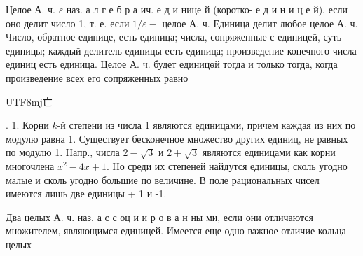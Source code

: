 \documentclass[10pt]{article}
\begin{document}
Целое А. ч. $\varepsilon$ наз. а л г е б р а ич. е д и нице й (коротко- е д и н и ц е й), если оно делит число 1, т. е. если $1 / \varepsilon-$ целое А. ч. Единица делит любое целое А. ч. Число, обратное единице, есть единица; числа, сопряженные с единицей, суть единицы; каждый делитель единицы есть единица; произведение конечного числа единиц есть единица. Целое А. ч. будет единицөй тогда и только тогда, когда произведение всех его сопряженных равно \begin{CJK}{UTF8}{mj}亡\end{CJK}. 1. Корни $k$-й степени из числа 1 являются единицами, причем каждая из них по модулю равна 1. Существует бесконечное множество других единиц, не равных по модулю 1. Напр., числа $2-\sqrt{3}$ и $2+\sqrt{3}$ являются единицами как корни многочлена $x^{2}-4 x+1$. Но среди их степеней найдутся единицы, сколь угодно малые и сколь угодно большие по величине. В поле рациональных чисел имеются лишь две единицы + 1 и -1.



Два целых А. ч. наз. а с с оц и и р о в а н ны ми, если они отличаются множителем, являющимся единицей. Имеется еще одно важное отличие кольца целых
\end{document}
